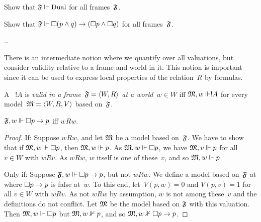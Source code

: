 \documentclass[modal-logic]{subfiles}
\begin{document}
\begin{prob}
Show that $\mathfrak F \Vdash \mathrm{Dual}$ for all frames~$\mathfrak F$.
\end{prob}

\begin{prob}
Show that $\mathfrak F \Vdash \Box(p \land q) \to (\Box p \land \Box q)$ for all frames~$\mathfrak F$.
\end{prob}

\begin{ex}
\dots
\end{ex}

There is an intermediate notion where we quantify over all valuations, but consider validity relative to a frame and world in it.  This notion is important since it can be used to express local properties of the relation~$R$ by formulas.

\begin{defn}
A \formula~$!A$ is \emph{valid in a frame~$\mathfrak F = \langle W, R\rangle$ at a world~$w \in W$} iff $\mathfrak M, w \Vdash !A$ for every model~$\mathfrak M = \langle W, R, V\rangle$ based on~$\mathfrak F$.
\end{defn}

\begin{prop}
$\mathfrak F, w \Vdash \Box p \to p$ iff $wRw$.
\end{prop}

\begin{proof}
If: Suppose $wRw$, and let $\mathfrak M$ be a model based on~$\mathfrak F$.  We have to show that if $\mathfrak M, w \Vdash \Box p$, then $\mathfrak M, w \Vdash p$.  As $\mathfrak M, w \Vdash \Box p$, we have $\mathfrak M, v \Vdash p$ for all $v \in W$ with $wRv$. As $wRw$, $w$ itself is one of these~$v$, and so $\mathfrak M, w \Vdash p$.

Only if: Suppose $\mathfrak F, w \Vdash \Box p \to p$, but not $wRw$.  We define a model based on~$\mathfrak F$ at where $\Box p \to p$ is false at~$w$.  To this end, let~$V(p, w) = 0$ and $V(p, v) = 1$ for all $v \in W$ with $wRv$.  As not $wRw$ by assumption, $w$ is not among these~$v$ and the definitions do not conflict. Let $\mathfrak M$ be the model based on $\mathfrak F$ with this valuation.  Then $\mathfrak M, w \Vdash \Box p$ but $\mathfrak M, w \nVdash p$, and so $\mathfrak M, w \nVdash \Box p \to p$.
\end{proof}
\end{document}
